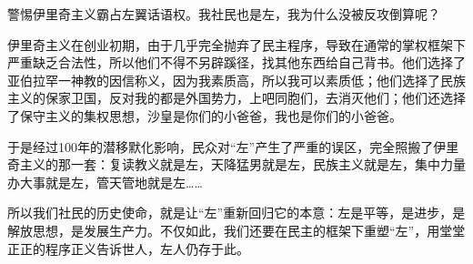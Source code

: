 \begin{zhihuanswer}
警惕伊里奇主义霸占左翼话语权。我社民也是左，我为什么没被反攻倒算呢？

伊里奇主义在创业初期，由于几乎完全抛弃了民主程序，导致在通常的掌权框架下严重缺乏合法性，所以他们不得不另辟蹊径，找其他东西给自己背书。他们选择了亚伯拉罕一神教的因信称义，因为我素质高，所以我可以素质低；他们选择了民族主义的保家卫国，反对我的都是外国势力，上吧同胞们，去消灭他们；他们还选择了保守主义的集权思想，沙皇是你们的小爸爸，我也是你们的小爸爸。

于是经过100年的潜移默化影响，民众对``左''产生了严重的误区，完全照搬了伊里奇主义的那一套：复读教义就是左，天降猛男就是左，民族主义就是左，集中力量办大事就是左，管天管地就是左\ldots\ldots{}

所以我们社民的历史使命，就是让``左''重新回归它的本意：左是平等，是进步，是解放思想，是发展生产力。不仅如此，我们还要在民主的框架下重塑``左''，用堂堂正正的程序正义告诉世人，左人仍存于此。
\end{zhihuanswer}
